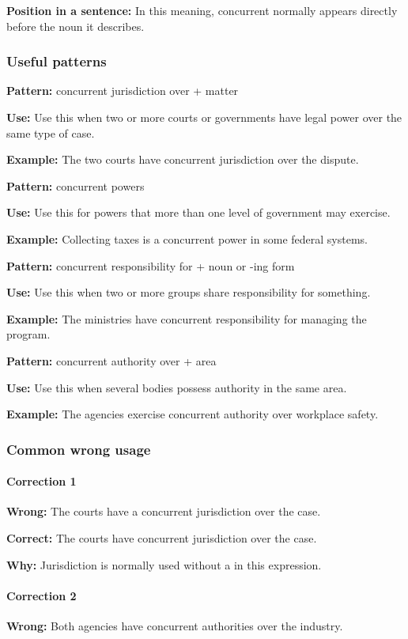 \documentclass[11pt]{article}
\begin{document}
\textbf{Position in a sentence:} In this meaning, concurrent normally appears directly before the noun it describes.

\subsubsection{Useful patterns}
\textbf{Pattern:} concurrent jurisdiction over + matter

\textbf{Use:} Use this when two or more courts or governments have legal power over the same type of case.

\textbf{Example:} The two courts have concurrent jurisdiction over the dispute.

\textbf{Pattern:} concurrent powers

\textbf{Use:} Use this for powers that more than one level of government may exercise.

\textbf{Example:} Collecting taxes is a concurrent power in some federal systems.

\textbf{Pattern:} concurrent responsibility for + noun or -ing form

\textbf{Use:} Use this when two or more groups share responsibility for something.

\textbf{Example:} The ministries have concurrent responsibility for managing the program.

\textbf{Pattern:} concurrent authority over + area

\textbf{Use:} Use this when several bodies possess authority in the same area.

\textbf{Example:} The agencies exercise concurrent authority over workplace safety.

\subsubsection{Common wrong usage}
\paragraph{Correction 1}
\textbf{Wrong:} The courts have a concurrent jurisdiction over the case.

\textbf{Correct:} The courts have concurrent jurisdiction over the case.

\textbf{Why:} Jurisdiction is normally used without a in this expression.

\paragraph{Correction 2}
\textbf{Wrong:} Both agencies have concurrent authorities over the industry.
\end{document}
